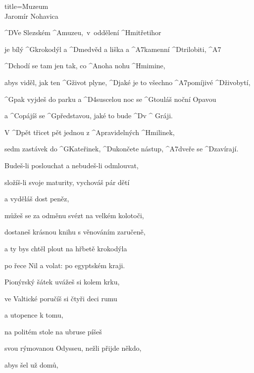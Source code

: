 \begin{song}{title=\predtitle\centering Muzeum \\\large Jaromír Nohavica  \vspace*{-0.3cm}}  %
\begin{centerjustified}

\sloka
	^{D}Ve Slezském ^{A\:\:}muzeu,~v~oddělení ^{Hmi\z}třetihor

	je bílý ^{G\z}krokodýl a ^{D\z}medvěd a liška a ^{A7\z}kamenní ^{D\z}trilobiti, ^{A7}

	^{D\z}chodí se tam jen tak, co ^{A\z}noha nohu ^{Hmi\z}mine,

	abys viděl, jak ten ^{G\z}život plyne, ^{D\z}jaké je to všechno ^{A7\z}pomíjivé ^{D\z}živobytí,

	^{G\z}pak vyjdeš do parku a ^{D4sus}celou noc se ^{G\z}touláš noční Opavou

	a ^{C\z}opájíš se ^{G\z}představou, jaké to bude ^{D}v ^{\,\,G}ráji.


	V ^{D\z}pět třicet pět jednou z ^{A\z}pravidelných ^{Hmi\z}linek,
	
	sedm zastávek do ^{G\z}Kateřinek, ^{D\z}ukončete nástup, ^{A7\z}dveře se ^{D\z}zavírají.

\begin{varwidth}[t]{0.48\textwidth}\setlength{\parindent}{\pindent}
\normalni

\sloka
	Budeš-li poslouchat a nebudeš-li odmlouvat,
	
	složíš-li svoje maturity, vychováš pár dětí
	
	a vyděláš dost peněz,
	
	můžeš se za odměnu svézt na velkém kolotoči,
	
	dostaneš krásnou knihu s věnováním zaručeně,
	
	a ty bys chtěl plout na hřbetě krokodýla
	
	po řece Nil a volat:  po egyptském kraji.
	

\sloka
	Pionýrský šátek uvážeš si kolem krku,
	
	ve Valtické poručíš si čtyři deci rumu
	
	a utopence k tomu,
	
	na politém stole na ubruse píšeš
	
	svou rýmovanou Odysseu, nežli přijde někdo,
	
	abys šel už domů,
	

\end{varwidth}
\end{centerjustified}
\end{song}
